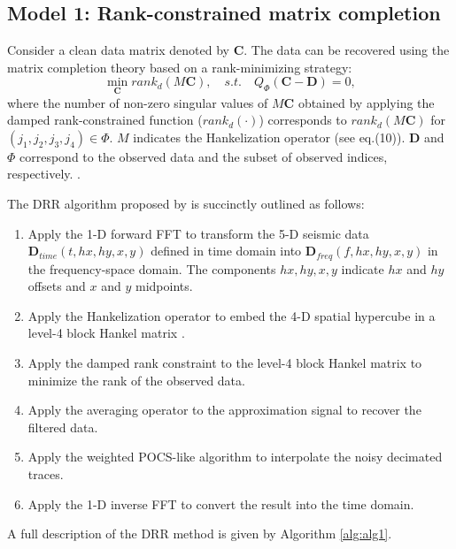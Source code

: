 \subsection{Model 1: Rank-constrained matrix completion}

Consider a clean data matrix denoted by $\mathbf{C}$. The  data can be recovered using the matrix completion theory based on a rank-minimizing strategy:
\begin{equation}
\min_{\mathbf{C}}rank_d(M\mathbf{C}),\quad s.t.\quad  {Q}_\Phi(\mathbf{C}-\mathbf{D})=0, 
\end{equation}
where the number of non-zero singular values of $M\mathbf{C}$ obtained by applying the damped rank-constrained function ($rank_d(\cdot)$) corresponds to $rank_d(M\mathbf{C})$ for $(j_1,j_2,j_3,j_4)\in\Phi$. $M$ indicates the Hankelization operator (see eq.(10)). $\mathbf{D}$ and $\Phi$ correspond to the observed data and the subset of observed indices, respectively. .

The DRR algorithm proposed by \cite{chen2016simultaneous} is succinctly outlined as follows:

\begin{enumerate}
	\item Apply the 1-D forward FFT to transform the 5-D seismic data $\mathbf{D}_{time}(t, hx, hy, x, y)$ defined in time domain into $\mathbf{D}_{freq}(f, hx, hy, x, y)$ in the frequency-space domain. The components $ hx, hy, x, y $ indicate $ hx $ and $ hy $ offsets and $ x $ and $ y $ midpoints.
	\item Apply the Hankelization operator to embed the 4-D spatial hypercube in a level-4 block Hankel matrix .
	\item Apply the damped rank constraint to the level-4 block Hankel matrix to minimize the rank of the observed data. 
	\item Apply the averaging operator to the approximation signal to recover the filtered data.
	\item Apply the weighted POCS-like algorithm to interpolate the noisy decimated traces.
	\item Apply the 1-D inverse FFT to convert the result into the time domain.
\end{enumerate}

A full description of the DRR method is given by Algorithm \ref{alg:alg1}.

